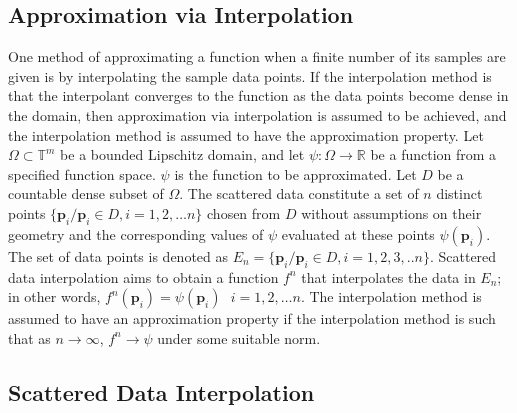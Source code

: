 \documentclass[multixcb]{amstext-l}
\theoremstyle{plain}
\theoremstyle{definition}
\theoremstyle{definition}
\theoremstyle{remark}
\numberwithin{equation}{chapter}
\begin{document}
\subsection{Approximation via Interpolation}
One method of approximating a function when a finite number of its samples are given is by interpolating the sample data points. If the interpolation method is that the interpolant converges to the function as the data points become dense in the domain, then approximation via interpolation is assumed to be achieved, and the interpolation method is assumed to have the approximation property. Let $\Omega\subset\mathbb{T}^m$ be a bounded Lipschitz domain, and let $\psi:\Omega\to\mathbb{R}$ be a function from a specified function space. $\psi$ is the function to be approximated. Let $D$ be a countable dense subset of $\Omega$. The scattered data constitute a set of $n$ distinct points $\{\boldsymbol{p}_i/\boldsymbol{p}_i\in D, i=1,2,\ldots n\}$ chosen from $D$ without assumptions on their geometry and the corresponding values of $\psi$ evaluated at these points $\psi(\boldsymbol{p}_i)$. The set of data points is denoted as $E_n = \{\boldsymbol{p}_i/\boldsymbol{p}_i\in D, i = 1,2,3,..n\}$. Scattered data interpolation aims to obtain a function $f^n$ that interpolates the data in $E_n$; in other words,  $f^n(\boldsymbol{p}_i) = \psi(\boldsymbol{p}_i)\mbox{   }i=1,2,\ldots n$. The interpolation method is assumed to have an approximation property if the interpolation method is such that as $n\to\infty$, $f^n\to \psi$ under some suitable norm.

\subsection{Scattered Data Interpolation}
\end{document}
